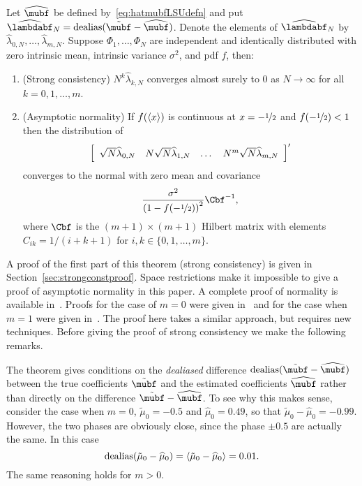 \documentclass[journal]{IEEEtran}
\begin{document}
\begin{theorem} \label{thm:asymp_proof} 
Let $\widehat{\mubf}$ be defined by~\eqref{eq:hatmubfLSUdefn} and put $\widehat{\lambdabf}_N = \dealias(\tilde{\mubf} - \widehat{\mubf})$.  Denote the elements of $\widehat{\lambdabf}_N$ by $\widehat{\lambda}_{0,N}, \dots, \widehat{\lambda}_{m,N}$.  Suppose $\Phi_1, \dots, \Phi_N$ are independent and identically distributed with zero intrinsic mean, intrinsic variance $\sigma^2$, and pdf $f$, then: 
\begin{enumerate}
\item (Strong consistency) $N^k \widehat{\lambda}_{k,N}$ converges almost surely to $0$ as $N\rightarrow\infty$ for all $k = 0, 1, \dots, m$.
\item (Asymptotic normality) If $f(\left\langle x \right\rangle)$ is continuous at $x = -\nicefrac{1}{2}$ and $f(-\nicefrac{1}{2}) < 1$ then the distribution of
\[
\left[
\begin{array}
[c]{cccc}%
\sqrt{N} \widehat{\lambda}_{0,N} & N \sqrt{N}\widehat{\lambda}_{1,N}  & \dots & N^m\sqrt{N} \widehat{\lambda}_{m,N}
\end{array}
\right]^\prime
\]
converges to the normal with zero mean and covariance
\[
\frac{\sigma^2}{\left(1-f( -\nicefrac{1}{2}) \right)^{2}} \Cbf^{-1},
\]
where $\Cbf$ is the $(m+1)\times (m+1)$ Hilbert matrix with elements $C_{ik} = 1/(i + k + 1)$ for $i,k \in \{0, 1, \dots, m\}$.
\end{enumerate}
\end{theorem}

A proof of the first part of this theorem (strong consistency) is given in Section~\ref{sec:strongconstproof}.  Space restrictions make it impossible to give a proof of asymptotic normality in this paper.  A complete proof of normality is available in~\cite{McKilliam_arxiv_pps_unwrapping_2012}.  Proofs for the case of $m=0$ were given in~\cite{McKilliam_mean_dir_est_sq_arc_length2010} and for the case when $m=1$ were given in~\cite{McKilliamFrequencyEstimationByPhaseUnwrapping2009}.  The proof here takes a similar approach, but requires new techniques.  Before giving the proof of strong consistency we make the following remarks.

The theorem gives conditions on the \emph{dealiased} difference $\dealias(\tilde{\mubf} - \widehat{\mubf})$ between the true coefficients $\tilde{\mubf}$ and the estimated coefficients $\widehat{\mubf}$ rather than directly on the difference $\tilde{\mubf} - \widehat{\mubf}$.   To see why this makes sense, consider the case when $m=0$, $\tilde{\mu}_0 = -0.5$ and $\widehat{\mu}_0 = 0.49$, so that $\tilde{\mu}_0 - \widehat{\mu}_0 = -0.99$.  However, the two phases are obviously close, since the phase $\pm 0.5$ are actually the same.  In this case 
\[
\operatorname{dealias}(\tilde{\mu}_0 - \widehat{\mu}_0) = \left\langle \tilde{\mu}_0 - \widehat{\mu}_0 \right\rangle = 0.01.
\] 
The same reasoning holds for $m > 0$.
\end{document}
